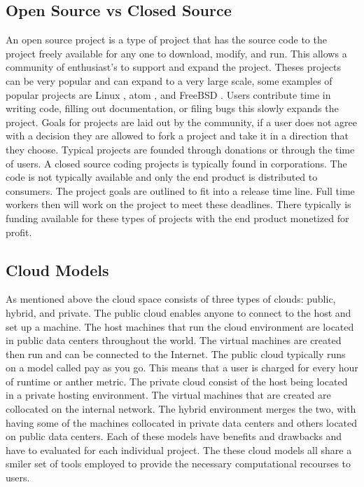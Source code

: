 \documentclass[12pt]{article}
\begin{document}
\subsection{Open Source vs Closed Source}
An open source project is a type of project that has the source code to the project freely available for any one to download, modify, and run. This allows a community of enthusiast's to support and expand the project. Theses projects can be very popular and can expand to a very large scale, some examples of popular projects are Linux \cite{Linux}, atom \cite{atom}, and FreeBSD \cite{freebsd}. Users contribute time in writing code, filling out documentation, or filing bugs this slowly expands the project. Goals for projects are laid out by the community, if a user does not agree with a decision they are allowed to fork a project and take it in a direction that they choose.  Typical projects are founded through donations or through the time of users.  A closed source coding projects is typically found in corporations. The code is not typically available and only the end product is distributed to consumers. The project goals are outlined to fit into a release time line. Full time workers then will work on the project to meet these deadlines. There typically is funding available for these types of projects with the end product monetized for profit.

\subsection{Cloud Models}
As mentioned above the cloud space consists of three types of clouds: public, hybrid, and private. The public cloud enables anyone to connect to the host and set up a machine. The host machines that run the cloud environment are located in public data centers throughout the world. The virtual machines are created then run and can be connected to the Internet. The public cloud typically runs on a model called pay as you go. This means that a user is charged for every hour of runtime or anther metric. The private cloud consist of the host being located in a private hosting environment. The virtual machines that are created are collocated on the internal network. The hybrid environment merges the two, with having some of the machines collocated in private data centers and others located on public data centers. Each of these models have benefits and drawbacks and have to evaluated for each individual project. The these cloud models all share a smiler set of tools employed to provide the necessary computational recourses to users.
\end{document}
